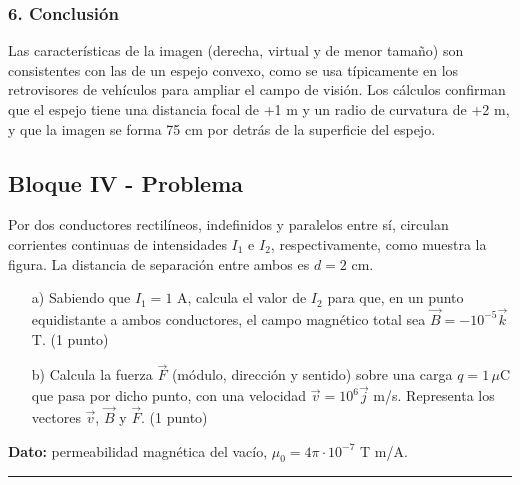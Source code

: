\subsubsection*{6. Conclusión}
\begin{cajaconclusion}
Las características de la imagen (derecha, virtual y de menor tamaño) son consistentes con las de un espejo convexo, como se usa típicamente en los retrovisores de vehículos para ampliar el campo de visión. Los cálculos confirman que el espejo tiene una distancia focal de +1 m y un radio de curvatura de +2 m, y que la imagen se forma 75 cm por detrás de la superficie del espejo.
\end{cajaconclusion}

\newpage
\subsection{Bloque IV - Problema}
\label{subsec:A4_2014_jun_ord}

\begin{cajaenunciado}
Por dos conductores rectilíneos, indefinidos y paralelos entre sí, circulan corrientes continuas de intensidades $I_1$ e $I_2$, respectivamente, como muestra la figura. La distancia de separación entre ambos es $d=2$ cm.
\begin{enumerate}
    \item[a)] Sabiendo que $I_1 = 1$ A, calcula el valor de $I_2$ para que, en un punto equidistante a ambos conductores, el campo magnético total sea $\vec{B} = -10^{-5} \vec{k}$ T. (1 punto)
    \item[b)] Calcula la fuerza $\vec{F}$ (módulo, dirección y sentido) sobre una carga $q=1 \, \mu\text{C}$ que pasa por dicho punto, con una velocidad $\vec{v} = 10^6 \vec{j}$ m/s. Representa los vectores $\vec{v}$, $\vec{B}$ y $\vec{F}$. (1 punto)
\end{enumerate}
\textbf{Dato:} permeabilidad magnética del vacío, $\mu_0 = 4\pi \cdot 10^{-7}$ T m/A.
\end{cajaenunciado}
\hrule

